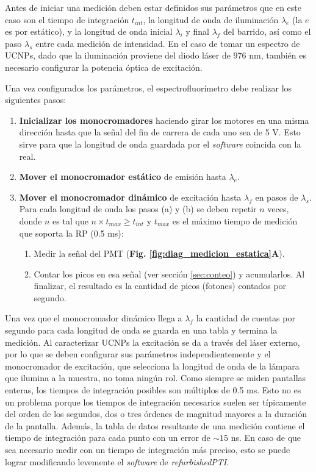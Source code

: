 Antes de iniciar una medición deben estar definidos sus parámetros que en este caso son el tiempo de integración $t_{int}$, la longitud de onda de iluminación $\lambda_e$ (la $e$ es por estático), y la longitud de onda inicial $\lambda_i$ y final $\lambda_f$ del barrido, así como el paso $\lambda_s$ entre cada medición de intensidad.
En el caso de tomar un espectro de UCNPs, dado que la iluminación proviene del diodo láser de 976 nm, también es necesario configurar la potencia óptica de excitación.

Una vez configurados los parámetros, el espectrofluorímetro debe realizar los siguientes pasos:

\begin{enumerate}
     \item \textbf{Inicializar los monocromadores} haciendo girar los motores en una misma dirección hasta que la señal del fin de carrera de cada uno sea de 5 V. Esto sirve para que la longitud de onda guardada por el \textit{software} coincida con la real.
     \item \textbf{Mover el monocromador estático} de emisión hasta $\lambda_e$. 
     \item \textbf{Mover el monocromador dinámico} de excitación hasta $\lambda_f$ en pasos de $\lambda_s$. Para cada longitud de onda los pasos (a) y (b) se deben repetir  $n$ veces, donde $n$ es tal que $n \times t_{max} \geq t_{int}$ y $t_{max}$ es el máximo tiempo de medición que soporta la RP (0.5 ms):
     \begin{enumerate}
          \item Medir la señal del PMT (\textbf{Fig. \ref{fig:diag_medicion_estatica}A}).
          \item Contar los picos en esa señal (ver sección \ref{sec:conteo}) y acumularlos. Al finalizar, el resultado es la cantidad de picos (fotones) contados por segundo.
     \end{enumerate}
\end{enumerate}

\noindent Una vez que el monocromador dinámico llega a $\lambda_f$ la cantidad de cuentas por segundo para cada longitud de onda se guarda en una tabla y termina la medición.
Al caracterizar UCNPs la excitación se da a través del láser externo, por lo que se deben configurar sus parámetros independientemente y el monocromador de excitación, que selecciona la longitud de onda de la lámpara que ilumina a la muestra, no toma ningún rol.
Como siempre se miden pantallas enteras, los tiempos de integración posibles son múltiplos de 0.5 ms.
Esto no es un problema porque los tiempos de integración necesarios suelen ser típicamente del orden de los segundos, dos o tres órdenes de magnitud mayores a la duración de la pantalla.
Además, la tabla de datos resultante de una medición contiene el tiempo de integración para cada punto con un error de $\sim 15$ ns.
En caso de que sea necesario medir con un tiempo de integración más preciso, esto se puede lograr modificando levemente el \textit{software} de \textit{refurbishedPTI}.

